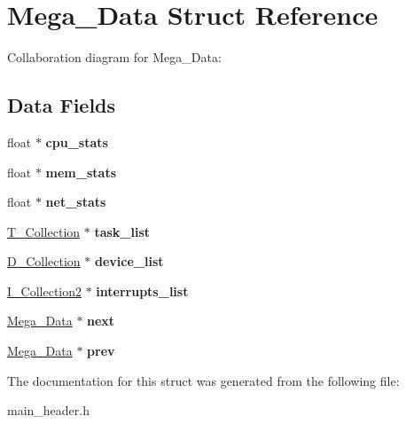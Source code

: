 \hypertarget{struct_mega___data}{}\section{Mega\+\_\+\+Data Struct Reference}
\label{struct_mega___data}


Collaboration diagram for Mega\+\_\+\+Data\+:
\subsection*{Data Fields}
\begin{DoxyCompactItemize}
\item 
float $\ast$ {\bfseries cpu\+\_\+stats}\hypertarget{struct_mega___data_a769f782d80a03eefeaa099313f2698f7}{}\label{struct_mega___data_a769f782d80a03eefeaa099313f2698f7}

\item 
float $\ast$ {\bfseries mem\+\_\+stats}\hypertarget{struct_mega___data_aebeb719a5ff14f4daa98808f679940e6}{}\label{struct_mega___data_aebeb719a5ff14f4daa98808f679940e6}

\item 
float $\ast$ {\bfseries net\+\_\+stats}\hypertarget{struct_mega___data_a74fb62c49c02bbf4eb4cf245855b7699}{}\label{struct_mega___data_a74fb62c49c02bbf4eb4cf245855b7699}

\item 
\hyperlink{struct_task___collection}{T\+\_\+\+Collection} $\ast$ {\bfseries task\+\_\+list}\hypertarget{struct_mega___data_a9d1ac7f39078d6fcc7b9d64dce406123}{}\label{struct_mega___data_a9d1ac7f39078d6fcc7b9d64dce406123}

\item 
\hyperlink{struct_device___collection}{D\+\_\+\+Collection} $\ast$ {\bfseries device\+\_\+list}\hypertarget{struct_mega___data_a9db847f1a9a234319ce00d74769d0d30}{}\label{struct_mega___data_a9db847f1a9a234319ce00d74769d0d30}

\item 
\hyperlink{struct_interrupt___collection2}{I\+\_\+\+Collection2} $\ast$ {\bfseries interrupts\+\_\+list}\hypertarget{struct_mega___data_ae89644db7aed319c811060a886603290}{}\label{struct_mega___data_ae89644db7aed319c811060a886603290}

\item 
\hyperlink{struct_mega___data}{Mega\+\_\+\+Data} $\ast$ {\bfseries next}\hypertarget{struct_mega___data_a7ab4e5cb18d7e3077b10457a2c48a3c9}{}\label{struct_mega___data_a7ab4e5cb18d7e3077b10457a2c48a3c9}

\item 
\hyperlink{struct_mega___data}{Mega\+\_\+\+Data} $\ast$ {\bfseries prev}\hypertarget{struct_mega___data_a588225306923509db138118efa04bf64}{}\label{struct_mega___data_a588225306923509db138118efa04bf64}

\end{DoxyCompactItemize}


The documentation for this struct was generated from the following file\+:\begin{DoxyCompactItemize}
\item 
main\+\_\+header.\+h\end{DoxyCompactItemize}
